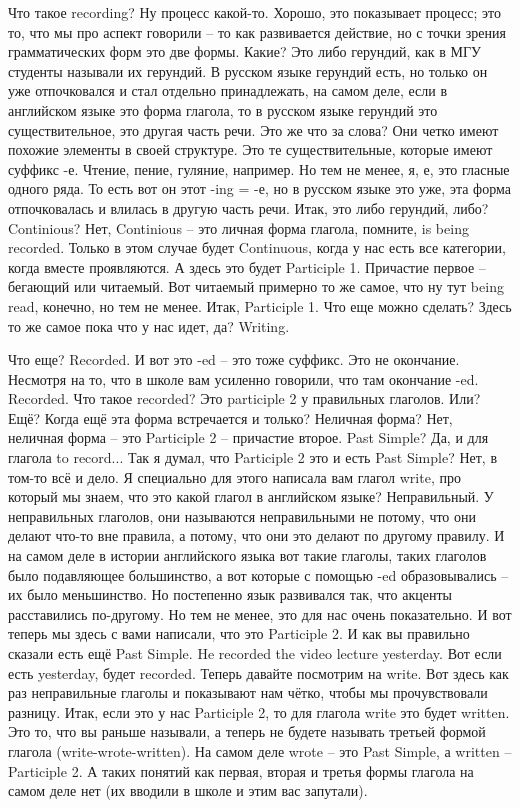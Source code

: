 \documentclass[main.tex]{subfiles}
\begin{document}
Что такое recording?
Ну процесс какой-то.
Хорошо, это показывает процесс; это то, что мы про аспект говорили -- то как развивается действие, но с точки зрения грамматических форм это две формы.
Какие?
Это либо герундий, как в МГУ студенты называли их герундий.
В русском языке герундий есть, но только он уже отпочковался и стал отдельно принадлежать, на самом деле, если в английском языке это форма глагола, то в русском языке герундий это существительное, это другая часть речи.
Это же что за слова?
Они четко имеют похожие элементы в своей структуре.
Это те существительные, которые имеют суффикс -е.
Чтение, пение, гуляние, например.
Но тем не менее, я, е, это гласные одного ряда.
То есть вот он этот -ing = -е, но в русском языке это уже, эта форма отпочковалась и влилась в другую часть речи.
Итак, это либо герундий, либо?
Continious?
Нет, Continious -- это личная форма глагола, помните, is being recorded.
Только в этом случае будет Continuous, когда у нас есть все категории, когда вместе проявляются.
А здесь это будет Participle 1.
Причастие первое -- бегающий или читаемый.
Вот читаемый примерно то же самое, что ну тут being read, конечно, но тем не менее.
Итак, Participle 1.
Что еще можно сделать?
Здесь то же самое пока что у нас идет, да? Writing.

Что еще?
Recorded.
И вот это -ed -- это тоже суффикс.
Это не окончание.
Несмотря на то, что в школе вам усиленно говорили, что там окончание -ed.
Recorded.
Что такое recorded?
Это participle 2 у правильных глаголов.
Или?
Ещё?
Когда ещё эта форма встречается и только?
Неличная форма?
Нет, неличная форма -- это Participle 2 -- причастие второе.
Past Simple?
Да, и для глагола to record...
Так я думал, что Participle 2 это и есть Past Simple? Нет, в том-то всё и дело.
Я специально для этого написала вам глагол write, про который мы знаем, что это какой глагол в английском языке?
Неправильный.
У неправильных глаголов, они называются неправильными не потому, что они делают что-то вне правила, а потому, что они это делают по другому правилу.
И на самом деле в истории английского языка вот такие глаголы, таких глаголов было подавляющее большинство, а вот которые с помощью -ed образовывались -- их было меньшинство.
Но постепенно язык развивался так, что акценты расставились по-другому.
Но тем не менее, это для нас очень показательно.
И вот теперь мы здесь с вами написали, что это Participle 2.
И как вы правильно сказали есть ещё Past Simple.
He recorded the video lecture yesterday.
Вот если есть yesterday, будет recorded.
Теперь давайте посмотрим на write.
Вот здесь как раз неправильные глаголы и показывают нам чётко, чтобы мы прочувствовали разницу.
Итак, если это у нас Participle 2, то для глагола write это будет written.
Это то, что вы раньше называли, а теперь не будете называть третьей формой глагола (write-wrote-written).
На самом деле wrote -- это Past Simple, а written -- Participle 2.
А таких понятий как первая, вторая и третья формы глагола на самом деле нет (их вводили в школе и этим вас запутали).
\end{document}
